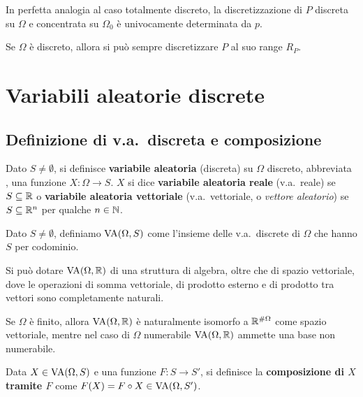 \begin{multicols*}{2}
\begin{remark}
    In perfetta analogia al caso totalmente discreto, la discretizzazione
    di $P$ discreta su $\Omega$ e concentrata su $\Omega_0$ è univocamente
    determinata da $p$.
\end{remark}

\begin{remark}
    Se $\Omega$ è discreto, allora si può sempre discretizzare
    $P$ al suo range $R_P$.
\end{remark}

\section{Variabili aleatorie discrete}

\subsection{Definizione di v.a.~discreta e composizione}

\begin{definition}
    Dato $S \neq \emptyset$, si definisce \textbf{variabile
    aleatoria} (discreta) su $\Omega$ discreto, abbreviata \va, una funzione
    $X : \Omega \to S$. $X$ si dice \textbf{variabile aleatoria reale}
    (v.a.~reale) se $S \subseteq \mathbb{R}$ o \textbf{variabile aleatoria vettoriale}
    (v.a.~vettoriale, o \textit{vettore aleatorio}) se $S \subseteq \mathbb{R}^n$ per
    qualche $n \in \mathbb{N}$. \smallskip


    Dato $S \neq \emptyset$, definiamo $\operatorname{VA}(\Omega, S)$ come l'insieme
    delle v.a.~discrete di $\Omega$ che hanno $S$ per codominio.
\end{definition}

\begin{remark}
    Si può dotare $\operatorname{VA}(\Omega, \mathbb{R})$ di una struttura di algebra, oltre che di
    spazio vettoriale, dove le operazioni di somma vettoriale, di prodotto
    esterno e di prodotto tra vettori sono completamente naturali. \medskip


    Se $\Omega$ è finito, allora $\operatorname{VA}(\Omega, \mathbb{R})$ è naturalmente isomorfo
    a $\mathbb{R}^{\# \Omega}$ come spazio vettoriale, mentre
    nel caso di $\Omega$ numerabile $\operatorname{VA}(\Omega, \mathbb{R})$ ammette una base non numerabile.
\end{remark}

\begin{definition}
    Data $X \in \operatorname{VA}(\Omega, S)$ e una funzione $F : S \to S'$,
    si definisce la \textbf{composizione di $X$ tramite $F$}
    come $F(X) = F \circ X \in \operatorname{VA}(\Omega, S')$.
\end{definition}


\end{multicols*}
